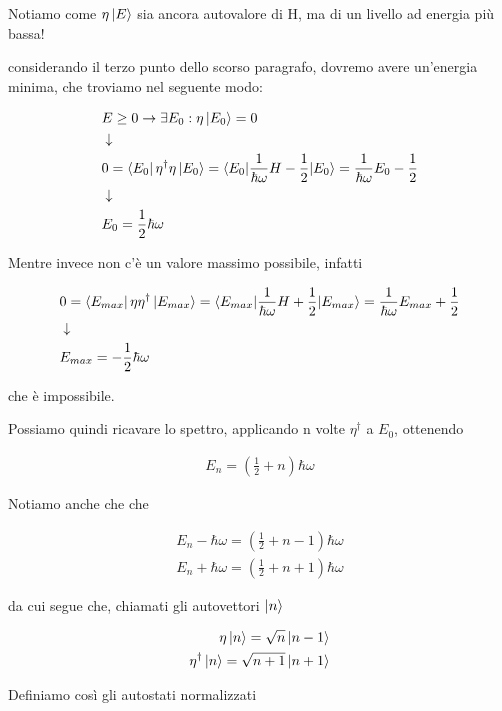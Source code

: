 Notiamo come $\eta \ket{E}$ sia ancora autovalore di H, ma di un livello ad energia più bassa!

considerando il terzo punto dello scorso paragrafo, dovremo avere un'energia minima, che troviamo nel seguente modo: 

\begin{align}
{}&E \geq 0 \rightarrow \exists E_0: \eta \ket{E_0}=0 \\
&\downarrow \nonumber \\
&0=\bra{E_0}\eta^\dagger\eta \ket{E_0} = \braket{E_0|\frac{1}{\hbar\omega}H -\frac{1}{2}|E_0}= \frac{1}{\hbar\omega}E_0 -\frac{1}{2} \nonumber\\
&\downarrow \nonumber \\
& E_0= \frac{1}{2}\hbar\omega
\end{align}

Mentre invece non c'è un valore massimo possibile, infatti

\begin{align}
{}&0=\bra{E_{max}}\eta\eta^\dagger \ket{E_{max}} = \braket{E_{max}|\frac{1}{\hbar\omega}H +\frac{1}{2}|E_{max}}= \frac{1}{\hbar\omega}E_{max}+\frac{1}{2} \nonumber\\
&\downarrow \nonumber \\
& E_{max}= -\frac{1}{2}\hbar\omega
\end{align}

che è impossibile. 
 
Possiamo quindi ricavare lo spettro, applicando n volte $\eta^\dagger$ a $E_0$, ottenendo

\begin{align}
E_n= \left(\frac{1}{2}+n\right)\hbar\omega
\end{align}

Notiamo anche che che

\begin{align}
E_n-\hbar \omega = \left(\frac{1}{2}+n - 1\right)\hbar\omega \\
E_n+\hbar \omega = \left(\frac{1}{2}+n + 1\right)\hbar\omega
\end{align}

da cui segue che, chiamati gli autovettori $\ket{n}$

\begin{align}
\eta \ket{n}=\sqrt{n}\ket{n- 1}\\
\eta^\dagger  \ket{n}= \sqrt{n+1}\ket{n+ 1}
\end{align}

Definiamo così gli autostati normalizzati

